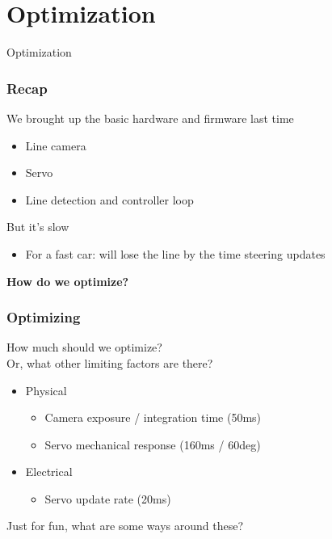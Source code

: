 \documentclass{beamer}
\begin{document}
\begin{frame}
\titlepage
\setcounter{tocdepth}{1}
\tableofcontents
\end{frame}

\section{Optimization} %
\begin{frame}
\centering \huge Optimization
\end{frame}


\begin{frame}
\frametitle{Recap}
We brought up the basic hardware and firmware last time \\
\begin{itemize}
  \item Line camera
  \item Servo
  \item Line detection and controller loop
\end{itemize}
\hfill \break
But it's slow
\begin{itemize}
  \item For a fast car: will lose the line by the time steering updates
\end{itemize}
\hfill \break
\textbf{How do we optimize?}
\end{frame}


\begin{frame}
\frametitle{Optimizing}
How much should we optimize? \\
Or, what other limiting factors are there?

 {
\begin{itemize}
  \item Physical
   {
    \begin{itemize}
      \item Camera exposure / integration time (50ms)
      \item Servo mechanical response (160ms / 60deg)
    \end{itemize}
  }
  \item Electrical
   {
    \begin{itemize}
      \item Servo update rate (20ms)
    \end{itemize}
  }
\end{itemize}
}
 {
Just for fun, what are some ways around these?
}
\end{frame}
\end{document}
